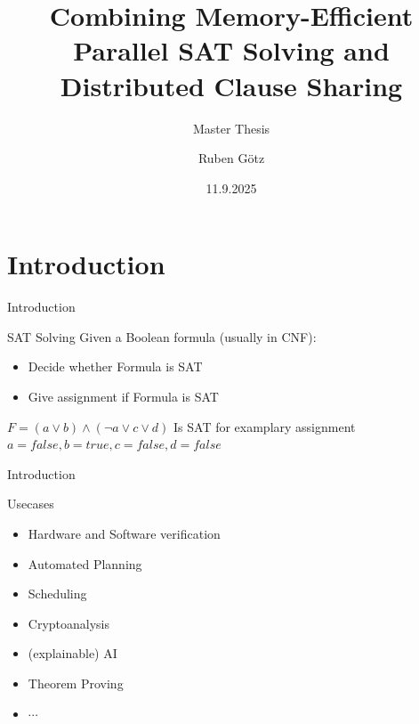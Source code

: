 \documentclass{beamer}
\title{Combining Memory-Efficient Parallel SAT Solving and Distributed Clause Sharing}
\subtitle{Master Thesis}
\author{Ruben Götz}
\date{11.9.2025}
\begin{document}
\frame{\titlepage}

\section{Introduction}
\begin{frame}{Introduction}
    \begin{block}{SAT Solving}
        Given a Boolean formula (usually in CNF):
        \begin{itemize}
            \item Decide whether Formula is SAT
            \item Give assignment if Formula is SAT
        \end{itemize}
    \end{block}

    \begin{exampleblock}{$F = (a \lor b) \land (\lnot a \lor c \lor d)$}
        Is SAT for examplary assignment $a = false, b = true, c = false, d = false$
    \end{exampleblock}
\end{frame}

\begin{frame}{Introduction}
    \begin{block}{Usecases}
        \begin{itemize}
            \item Hardware and Software verification
            \item Automated Planning
            \item Scheduling
            \item Cryptoanalysis
            \item (explainable) AI
            \item Theorem Proving
            \item $\cdots$
        \end{itemize}
    \end{block}
\end{frame}

\end{document}
